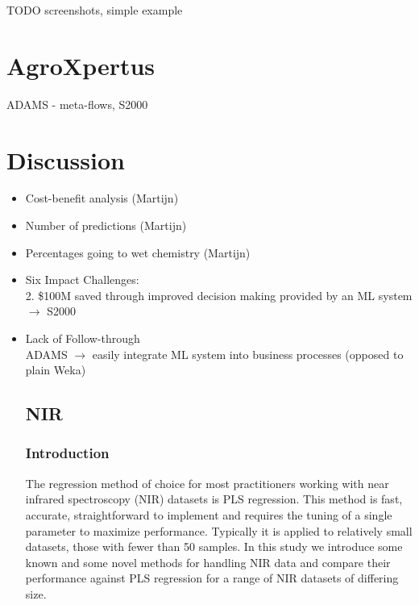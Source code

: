\documentclass{llncs}
\begin{document}
TODO screenshots, simple example


\section{AgroXpertus}
ADAMS - meta-flows, S2000

\section{Discussion}
\begin{itemize}
  \item Cost-benefit analysis (Martijn)
  \item Number of predictions (Martijn)
  \item Percentages going to wet chemistry (Martijn)
  \item Six Impact Challenges: \\
    2. \$100M saved through improved decision making provided by an ML system $\rightarrow$ S2000
  \item Lack of Follow-through \\
	ADAMS $\rightarrow$ easily integrate ML system into business processes (opposed to plain Weka)

\subsection{NIR}
\subsubsection{Introduction}
The regression method of choice for most practitioners working with near infrared spectroscopy (NIR) datasets is PLS regression. This method is fast, accurate, straightforward to implement and requires the tuning of a single parameter to maximize performance. Typically it is applied to relatively small datasets, those with fewer than 50 samples. In this study we introduce some known and some novel methods for handling NIR data and compare their performance against PLS regression for a range of NIR datasets of differing size.


\end{itemize}
\end{document}
